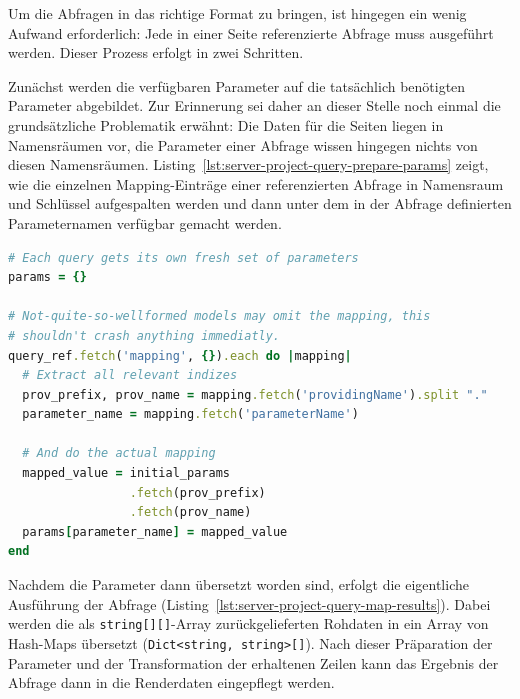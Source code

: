 Um die Abfragen in das richtige Format zu bringen, ist hingegen ein wenig Aufwand erforderlich: Jede in einer Seite referenzierte Abfrage muss ausgeführt werden. Dieser Prozess erfolgt in zwei Schritten.

Zunächst werden die verfügbaren Parameter auf die tatsächlich benötigten Parameter abgebildet. Zur Erinnerung sei daher an dieser Stelle noch einmal die grundsätzliche Problematik erwähnt: Die Daten für die Seiten liegen in Namensräumen vor, die Parameter einer Abfrage wissen hingegen nichts von diesen Namensräumen. Listing~\ref{lst:server-project-query-prepare-params} zeigt, wie die einzelnen Mapping-Einträge einer referenzierten Abfrage in Namensraum und Schlüssel aufgespalten werden und dann unter dem in der Abfrage definierten Parameternamen verfügbar gemacht werden.

\begin{lstlisting}[float=h, language=Ruby, caption={Renderdaten einer Abfrage (1): Parameter binden}, label={lst:server-project-query-prepare-params}]
# Each query gets its own fresh set of parameters
params = {}

# Not-quite-so-wellformed models may omit the mapping, this
# shouldn't crash anything immediatly.
query_ref.fetch('mapping', {}).each do |mapping|
  # Extract all relevant indizes
  prov_prefix, prov_name = mapping.fetch('providingName').split "."
  parameter_name = mapping.fetch('parameterName')
  
  # And do the actual mapping
  mapped_value = initial_params
                 .fetch(prov_prefix)
                 .fetch(prov_name)
  params[parameter_name] = mapped_value
end
\end{lstlisting}

Nachdem die Parameter dann übersetzt worden sind, erfolgt die eigentliche Ausführung der Abfrage (Listing~\ref{lst:server-project-query-map-results}). Dabei werden die als \texttt{string[][]}-Array zurückgelieferten Rohdaten in ein Array von Hash-Maps übersetzt (\texttt{Dict<string, string>[]}). Nach dieser Präparation der Parameter und der Transformation der erhaltenen Zeilen kann das Ergebnis der Abfrage dann in die Renderdaten eingepflegt werden.

